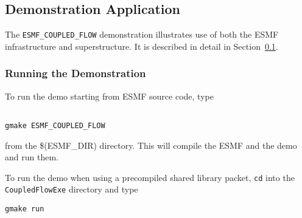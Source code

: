 \subsection{Demonstration Application}
\label{sec:demo}

The {\tt ESMF\_COUPLED\_FLOW} demonstration illustrates use of both the
ESMF infrastructure and superstructure.  It is described in detail in 
Section~\ref{sec:demo}.

\subsubsection{Running the Demonstration}

To run the demo starting from ESMF source code, type 
\begin{verbatim}

gmake ESMF_COUPLED_FLOW

\end{verbatim}
from the \$(ESMF\_DIR) directory.  This will compile the 
ESMF and the demo and run them.

To run the demo when using a precompiled shared
library packet, {\tt cd} into the {\tt CoupledFlowExe}
directory and type

\begin{verbatim}
gmake run
\end{verbatim}






























